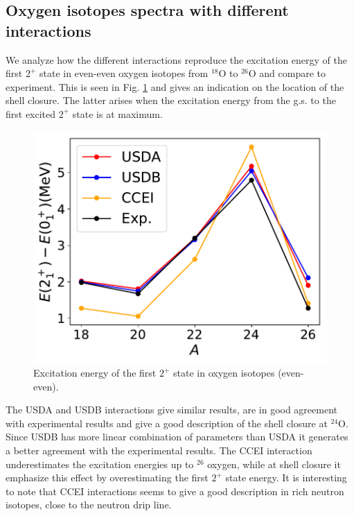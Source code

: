 \subsection{Oxygen isotopes spectra with different interactions} \label{Oxygen}
%
We analyze how the different interactions reproduce the excitation energy of the first $2^+$ state in even-even oxygen isotopes from $^{18}$O to $^{26}$O and compare to experiment. This is seen in Fig. \ref{fig:2+/0+}   and gives an indication on the location of the shell closure. The latter  arises when the excitation energy from the g.s. to the first excited $2^+$ state is at maximum.

\begin{figure}[htb!]
\centering
\includegraphics[width=1\linewidth]{2+_over_0+.pdf}
\caption{Excitation energy of the first $2^+$ state in oxygen isotopes (even-even).}
\label{fig:2+/0+}
\end{figure}

The USDA and USDB interactions give similar results,  are in good agreement with experimental results and give a good description of the shell closure at $^{24}$O. Since USDB has more linear combination of parameters than USDA it generates a better agreement with the experimental results. 
The CCEI interaction underestimates the excitation energies up to $^{26}$ oxygen, while at shell closure it emphasize this effect by overestimating the first $2^+$ state energy. 
It is interesting to note that CCEI interactions seems to give a good description in rich neutron isotopes, close to the neutron drip line.

